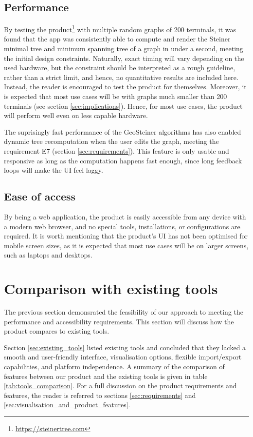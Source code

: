 \documentclass{l4proj}
\begin{document}
\subsection{Performance}
\label{sec:performance}
By testing the product\footnote{\url{https://steinertree.com}} with multiple random graphs of 200 terminals, it was found that the app was consistently able to compute and render the Steiner minimal tree and minimum spanning tree of a graph in under a second, meeting the initial design constraints. Naturally, exact timing will vary depending on the used hardware, but the constraint should be interpreted as a rough guideline, rather than a strict limit, and hence, no quantitative results are included here. Instead, the reader is encouraged to test the product for themselves. Moreover, it is expected that most use cases will be with graphs much smaller than 200 terminals (see section \ref{sec:implications}). Hence, for most use cases, the product will perform well even on less capable hardware.

The suprisingly fast performance of the GeoSteiner algorithms has also enabled dynamic tree recomputation when the user edits the graph, meeting the requirement E7 (section \ref{sec:requirements}). This feature is only usable and responsive as long as the computation happens fast enough, since long feedback loops will make the UI feel laggy.
\subsection{Ease of access}
By being a web application, the product is easily accessible from any device with a modern web browser, and no special tools, installations, or configurations are required. It is worth mentioning that the product's UI has not been optimised for mobile screen sizes, as it is expected that most use cases will be on larger screens, such as laptops and desktops.



\section{Comparison with existing tools}
The previous section demonsrated the feasibility of our approach to meeting the performance and accessibility requirements.
This section will discuss how the product compares to existing tools.

Section \ref{sec:existing_tools} listed existing tools and concluded that they lacked a smooth and user-friendly interface, visualisation options, flexible import/export capabilities, and platform independence. A summary of the comparison of features between our product and the existing tools is given in table \ref{tab:tools_comparison}. For a full discussion on the product requirements and features, the reader is referred to sections \ref{sec:requirements} and \ref{sec:visualisation_and_product_features}.
\end{document}
